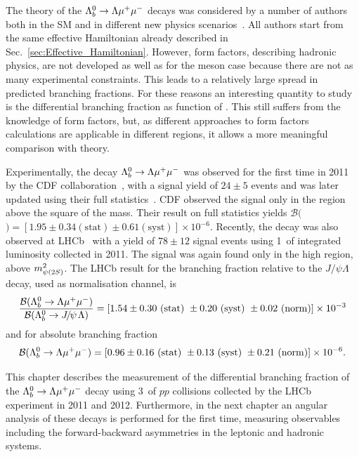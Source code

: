 The theory of the ${{\Lambda}^0_{b}}\rightarrow{\ensuremath{\Lambda}}{\ensuremath{\mu^+\mu^-}}$ decays was considered by a number of authors both in the SM and in different
new physics scenarios~\cite{Aslam:2008hp,Wang:2008sm,Huang:1998ek,Chen:2001ki,Chen:2001zc,Chen:2001sj,
Zolfagharpour:2007eh,Mott:2011cx,Aliev:2010uy,Mohanta:2010eb,Sahoo:2011yb}.
All authors start from the same effective Hamiltonian already described in Sec.~\ref{sec:Effective_Hamiltonian}. 
However, form factors, describing hadronic physics, are not developed as well as for the meson case 
because there are not as many experimental constraints. This leads to a relatively
large spread in predicted branching fractions. For these reasons an interesting quantity to study is the differential 
branching fraction as function of \qsq. This still suffers from the knowledge of form factors, but, as different 
approaches to form factors calculations are applicable in different \qsq regions, it allows a more meaningful comparison with theory.

Experimentally, the decay ${{\Lambda}^0_{b}}\rightarrow{\ensuremath{\Lambda}}{\ensuremath{\mu^+\mu^-}}$ was observed for the first time in 2011 by the CDF 
collaboration~\cite{Aaltonen:2011qs}, with a signal yield of $24\pm5$ events and was later updated using
their full statistics~\cite{Behari:2013xc}. CDF observed the signal only in the \qsq region above the square of the \psitwos mass.
Their result on full statistics yields $\mathcal{B}($\Lb\to\Lz\mumu$) =[1.95\pm0.34(\mathrm{stat})\pm0.61(\mathrm{syst})]\times 10^{-6}$.
Recently, the decay was also observed at LHCb~\cite{LHCb-PAPER-2013-025} with a yield of $78\pm12$ signal events
using 1~\invfb of integrated luminosity collected in 2011. The signal was again found only in the high \qsq region, above $m^2_{\psitwos}$.
The LHCb result for the branching fraction relative to the $J/\psi\Lambda$ decay, used as normalisation channel, is 
%
\begin{equation*}
\frac{\mathcal{B}(\Lb\to\Lz\mumu)}{\mathcal{B}(\Lb\to\jpsi\Lz)}=[1.54 \pm 0.30 ~(\mathrm{stat})~ \pm 0.20 ~(\mathrm{syst})~ \pm 0.02 ~(\mathrm{norm})]\times 10^{-3} 
\end{equation*}
and for absolute branching fraction
\begin{equation*}
\mathcal{B}({{\Lambda}^0_{b}}\rightarrow{\ensuremath{\Lambda}}{\ensuremath{\mu^+\mu^-}}) =[0.96 \pm 0.16 ~(\mathrm{stat})~ \pm 0.13 ~(\mathrm{syst})~ \pm 0.21 ~(\mathrm{norm})]\times 10^{-6}.
\end{equation*}

This chapter describes the measurement of the differential branching fraction
of the ${{\Lambda}^0_{b}}\rightarrow{\ensuremath{\Lambda}}{\ensuremath{\mu^+\mu^-}}$ decay using 3~\invfb of $pp$ collisions collected by the LHCb experiment in 2011 and 2012.
Furthermore, in the next chapter an angular analysis of these decays is performed for the first time, measuring observables
including the forward-backward asymmetries in the leptonic and hadronic systems.

